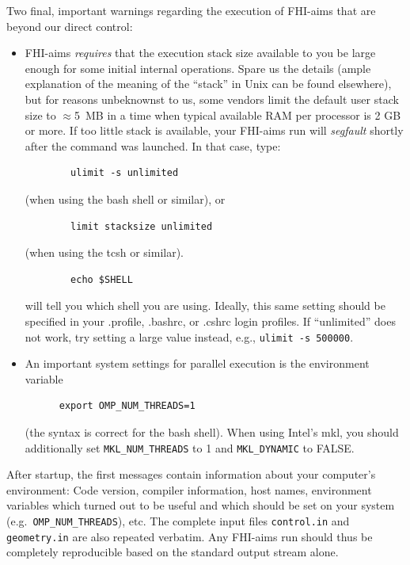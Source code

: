 Two final, important warnings regarding the execution of FHI-aims that are beyond
our direct control:
\begin{itemize}
  \item FHI-aims \emph{requires} that the execution stack size available to
    you be large enough for some initial internal operations. Spare us the
    details (ample explanation of the meaning of the ``stack'' in Unix can be
    found elsewhere), but for reasons unbeknownst to us, some vendors limit
    the default user stack size to $\approx$5~MB in a time when typical
    available RAM per processor is 2 GB or more. If too little stack is
    available, your FHI-aims run will \emph{segfault} shortly after the
    command was launched. In that case, type:
    \begin{verbatim}
        ulimit -s unlimited
    \end{verbatim}
    (when using the bash shell or similar), or
    \begin{verbatim}
        limit stacksize unlimited
    \end{verbatim}
    (when using the tcsh or similar). 
    \begin{verbatim}
        echo $SHELL
    \end{verbatim}
    will tell you which shell you are using. Ideally, this same setting should
    be specified in your .profile, .bashrc, or .cshrc login profiles. If
    ``unlimited'' does not work, try setting a large value instead, e.g.,
    \texttt{ulimit -s 500000}.
  \item An important system settings for parallel execution is the environment
    variable  
    \begin{verbatim}
      export OMP_NUM_THREADS=1
    \end{verbatim}
    (the syntax is correct for the bash shell). When using Intel's mkl, you
    should additionally set \texttt{MKL\_NUM\_THREADS} to 1 and
    \texttt{MKL\_DYNAMIC} to FALSE.
\end{itemize}

After startup, the first messages contain information about your computer's 
environment: Code version, compiler information, host names, environment 
variables which turned out to be useful and which should be set on
your system (e.g.~\texttt{OMP\_NUM\_THREADS}), etc. The complete input
files \texttt{control.in} and \texttt{geometry.in} are also repeated
verbatim. Any FHI-aims run should thus be completely reproducible
based on the standard output stream alone.

